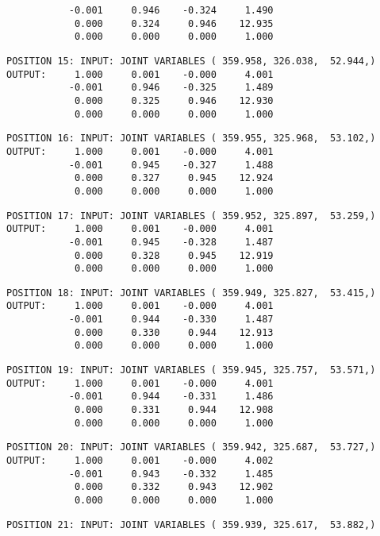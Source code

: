 \begin{verbatim}
           -0.001     0.946    -0.324     1.490
            0.000     0.324     0.946    12.935
            0.000     0.000     0.000     1.000
\end{verbatim} \pagebreak[1]\begin{verbatim}
POSITION 15: INPUT: JOINT VARIABLES ( 359.958, 326.038,  52.944,)
OUTPUT:     1.000     0.001    -0.000     4.001
           -0.001     0.946    -0.325     1.489
            0.000     0.325     0.946    12.930
            0.000     0.000     0.000     1.000
\end{verbatim} \pagebreak[1]\begin{verbatim}
POSITION 16: INPUT: JOINT VARIABLES ( 359.955, 325.968,  53.102,)
OUTPUT:     1.000     0.001    -0.000     4.001
           -0.001     0.945    -0.327     1.488
            0.000     0.327     0.945    12.924
            0.000     0.000     0.000     1.000
\end{verbatim} \pagebreak[1]\begin{verbatim}
POSITION 17: INPUT: JOINT VARIABLES ( 359.952, 325.897,  53.259,)
OUTPUT:     1.000     0.001    -0.000     4.001
           -0.001     0.945    -0.328     1.487
            0.000     0.328     0.945    12.919
            0.000     0.000     0.000     1.000
\end{verbatim} \pagebreak[1]\begin{verbatim}
POSITION 18: INPUT: JOINT VARIABLES ( 359.949, 325.827,  53.415,)
OUTPUT:     1.000     0.001    -0.000     4.001
           -0.001     0.944    -0.330     1.487
            0.000     0.330     0.944    12.913
            0.000     0.000     0.000     1.000
\end{verbatim} \pagebreak[1]\begin{verbatim}
POSITION 19: INPUT: JOINT VARIABLES ( 359.945, 325.757,  53.571,)
OUTPUT:     1.000     0.001    -0.000     4.001
           -0.001     0.944    -0.331     1.486
            0.000     0.331     0.944    12.908
            0.000     0.000     0.000     1.000
\end{verbatim} \pagebreak[1]\begin{verbatim}
POSITION 20: INPUT: JOINT VARIABLES ( 359.942, 325.687,  53.727,)
OUTPUT:     1.000     0.001    -0.000     4.002
           -0.001     0.943    -0.332     1.485
            0.000     0.332     0.943    12.902
            0.000     0.000     0.000     1.000
\end{verbatim} \pagebreak[1]\begin{verbatim}
POSITION 21: INPUT: JOINT VARIABLES ( 359.939, 325.617,  53.882,)

\end{verbatim}
